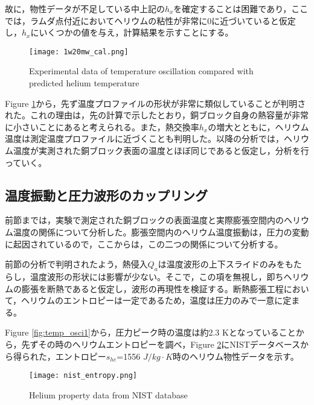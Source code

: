 故に，物性データが不足している中上記の$h_x$を確定することは困難であり，ここでは，ラムダ点付近においてヘリウムの粘性が非常に0に近づいていると仮定し，$h_x$にいくつかの値を与え，計算結果を示すことにする。

\begin{figure}[h!]
\begin{center}
\texttt{[image: 1w20mw\_cal.png]}
\caption{Experimental data of temperature oscillation compared with predicted helium temperature}
\label{fig:1w20mw_cal}
\end{center}
\end{figure}

Figure \ref{fig:1w20mw_cal}から，先ず温度プロファイルの形状が非常に類似していることが判明された。これの理由は，先の計算で示したとおり，銅ブロック自身の熱容量が非常に小さいことにあると考えられる。また，熱交換率$h_x$の増大とともに，ヘリウム温度は測定温度プロファイルに近づくことも判明した。以降の分析では，ヘリウム温度が実測された銅ブロック表面の温度とほぼ同じであると仮定し，分析を行っていく。

\subsection{温度振動と圧力波形のカップリング}

前節までは，実験で測定された銅ブロックの表面温度と実際膨張空間内のヘリウム温度の関係について分析した。膨張空間内のヘリウム温度振動は，圧力の変動に起因されているので，ここからは，この二つの関係について分析する。

前節の分析で判明されたよう，熱侵入$Q_a$は温度波形の上下スライドのみをもたらし，温度波形の形状には影響が少ない。そこで，この項を無視し，即ちヘリウムの膨張を断熱であると仮定し，波形の再現性を検証する。断熱膨張工程において，ヘリウムのエントロピーは一定であるため，温度は圧力のみで一意に定まる。

Figure \ref{fig:temp_osci1}から，圧力ピーク時の温度は約2.3 Kとなっていることから，先ずその時のヘリウムエントロピーを調べ，Figure \ref{fig:nist_entropy}にNISTデータベースから得られた，エントロピー$s_{he}$=1556 $J/kg\cdot K$時のヘリウム物性データを示す。


\begin{figure}[h!]
\begin{center}
\texttt{[image: nist\_entropy.png]}
\caption{Helium property data from NIST database}
\label{fig:nist_entropy}
\end{center}
\end{figure}

